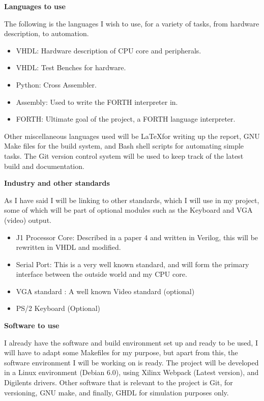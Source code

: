 \documentclass	[a4paper, 10pt]	{article}
\begin{document}
      \noindent \textbf{Languages to use}

      The following is the languages I wish to use, for a variety of tasks, from hardware
      description, to automation.

      \begin{itemize}
          \item  VHDL: Hardware description of CPU core and peripherals.
          \item  VHDL: Test Benches for hardware.
          \item  Python: Cross Assembler.
          \item  Assembly: Used to write the FORTH interpreter in.
          \item  FORTH: Ultimate goal of the project, a FORTH language interpreter.
      \end{itemize}

      Other miscellaneous languages used will be \LaTeX for writing up the report, GNU
      Make files for the build system, and Bash shell scripts for automating simple
      tasks. The Git version control system will be used to keep track of the latest
      build and documentation.

      \noindent \textbf{Industry and other standards}

      As I have said I will be linking to other standards, which I will use in my project,
      some of which will be part of optional modules such as the Keyboard and VGA
      (video) output.

      \begin{itemize}
          \item  J1 Processor Core: Described in a paper 4 and written in Verilog, this will
          be rewritten in VHDL and modified.
          \item  Serial Port: This is a very well known standard, and will form the primary
          interface between the outside world and my CPU core.
          \item  VGA standard : A well known Video standard (optional)
          \item  PS/2 Keyboard (Optional)
      \end{itemize}

      \noindent \textbf{Software to use}

      I already have the software and build environment set up and ready to be used,
      I will have to adapt some Makefiles for my purpose, but apart from this, the
      software environment I will be working on is ready. The project will be developed
      in a Linux environment (Debian 6.0), using Xilinx Webpack (Latest version),
      and Digilents drivers. Other software that is relevant to the project is Git, for
      versioning, GNU make, and finally, GHDL for simulation purposes only.
\end{document}
